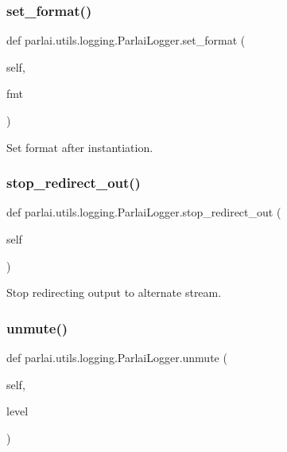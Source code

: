 \subsubsection{\texorpdfstring{set\+\_\+format()}{set\_format()}}
{\footnotesize\ttfamily def parlai.\+utils.\+logging.\+Parlai\+Logger.\+set\+\_\+format (\begin{DoxyParamCaption}\item[{}]{self,  }\item[{}]{fmt }\end{DoxyParamCaption})}

\begin{DoxyVerb}Set format after instantiation.
\end{DoxyVerb}
 \mbox{\label{classparlai_1_1utils_1_1logging_1_1ParlaiLogger_ad9b882180fc5cc0b81351f50d7fcd252}} 
\subsubsection{\texorpdfstring{stop\+\_\+redirect\+\_\+out()}{stop\_redirect\_out()}}
{\footnotesize\ttfamily def parlai.\+utils.\+logging.\+Parlai\+Logger.\+stop\+\_\+redirect\+\_\+out (\begin{DoxyParamCaption}\item[{}]{self }\end{DoxyParamCaption})}

\begin{DoxyVerb}Stop redirecting output to alternate stream.
\end{DoxyVerb}
 \mbox{\label{classparlai_1_1utils_1_1logging_1_1ParlaiLogger_ad00121b486f8553c45d9ab13e81567ab}} 
\subsubsection{\texorpdfstring{unmute()}{unmute()}}
{\footnotesize\ttfamily def parlai.\+utils.\+logging.\+Parlai\+Logger.\+unmute (\begin{DoxyParamCaption}\item[{}]{self,  }\item[{}]{level }\end{DoxyParamCaption})}

